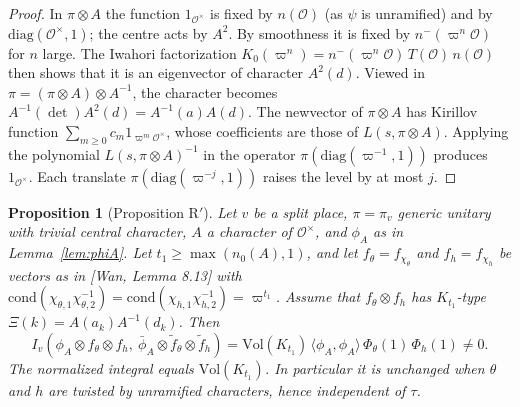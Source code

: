 \documentclass[11pt]{amsart}
\newtheorem{proposition}[theorem]{Proposition}
\theoremstyle{definition}
\theoremstyle{remark}
\newcommand{\cO}{\mathcal{O}}
\newcommand{\cond}{\mathrm{cond}}
\newcommand{\Vol}{\mathrm{Vol}}
\newcommand{\vp}{\varpi}
\newcommand{\nm}{n^{-}}
\newcommand{\diag}{\mathrm{diag}}
\begin{document}
\begin{proof}
In $\pi\otimes A$ the function $1_{\cO^\times}$ is fixed by $n(\cO)$ (as $\psi$ is unramified) and by $\diag(\cO^\times,1)$; the centre acts by $A^2$. By smoothness it is fixed by $\nm(\vp^n\cO)$ for $n$ large. The Iwahori factorization $K_0(\vp^n)=\nm(\vp^n\cO)\,T(\cO)\,n(\cO)$ then shows that it is an eigenvector of character $A^2(d)$. Viewed in $\pi=(\pi\otimes A)\otimes A^{-1}$, the character becomes $A^{-1}(\det)A^2(d)=A^{-1}(a)A(d)$. The newvector of $\pi\otimes A$ has Kirillov function $\sum_{m\ge0}c_m1_{\vp^m\cO^\times}$, whose coefficients are those of $L(s,\pi\otimes A)$. Applying the polynomial $L(s,\pi\otimes A)^{-1}$ in the operator $\pi(\diag(\vp^{-1},1))$ produces $1_{\cO^\times}$. Each translate $\pi(\diag(\vp^{-j},1))$ raises the level by at most $j$.
\end{proof}

\begin{proposition}[Proposition R$'$]\label{prop:R}
Let $v$ be a split place, $\pi=\pi_v$ generic unitary with trivial central character, $A$ a character of $\cO^\times$, and $\phi_A$ as in Lemma~\ref{lem:phiA}. Let $t_1\ge\max(n_0(A),1)$, and let $f_\theta=f_{\chi_\theta}$ and $f_h=f_{\chi_h}$ be vectors as in [Wan, Lemma 8.13] with $\cond(\chi_{\theta,1}\chi_{\theta,2}^{-1})=\cond(\chi_{h,1}\chi_{h,2}^{-1})=\vp^{t_1}$. Assume that $f_\theta\otimes f_h$ has $K_{t_1}$-type $\Xi(k)=A(a_k)A^{-1}(d_k)$. Then
\[ I_v(\phi_A\otimes f_\theta\otimes f_h,\ \bar\phi_A\otimes\tilde f_\theta\otimes\tilde f_h)=\Vol(K_{t_1})\,\langle\phi_A,\phi_A\rangle\,\Phi_\theta(1)\,\Phi_h(1)\neq0. \]
The normalized integral equals $\Vol(K_{t_1})$. In particular it is unchanged when $\theta$ and $h$ are twisted by unramified characters, hence independent of $\tau$.
\end{proposition}
\end{document}
